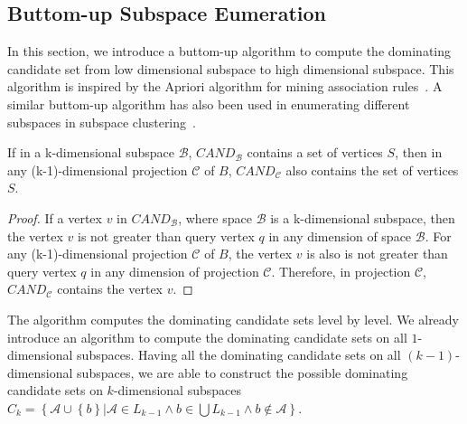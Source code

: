 \subsection{Buttom-up Subspace Eumeration}

In this section, we introduce a buttom-up algorithm to compute the dominating candidate set from low dimensional subspace to high dimensional subspace.
This algorithm is inspired by the Apriori algorithm for mining association rules~\cite{agrawal1996fast}. A similar buttom-up algorithm has also been used in enumerating different subspaces in subspace clustering~\cite{agrawal1998automatic}.

\begin{property}
If in a k-dimensional subspace $\mathcal{B}$, $\mathit{CAND}_\mathcal{B}$ contains a set of vertices $S$, then in any (k-1)-dimensional projection $\mathcal{C}$ of $B$, $\mathit{CAND}_\mathcal{C}$ also contains the set of vertices $S$.
\end{property}

\begin{proof}
If a vertex $v$ in $\mathit{CAND}_\mathcal{B}$, where space $\mathcal{B}$ is a k-dimensional subspace, then the vertex $v$ is not greater than query vertex $q$ in any dimension of space $\mathcal{B}$. For any (k-1)-dimensional projection $\mathcal{C}$ of $B$, the vertex $v$ is also is not greater than query vertex $q$ in any dimension of projection $\mathcal{C}$. Therefore, in projection $\mathcal{C}$, $\mathit{CAND}_\mathcal{C}$ contains the vertex $v$.
\end{proof}

The algorithm computes the dominating candidate sets level by level. We already introduce an algorithm to compute the dominating candidate sets on all $1$-dimensional subspaces. Having all the dominating candidate sets on all $(k-1)$-dimensional subspaces, we are able to construct the possible dominating candidate sets on $k$-dimensional subspaces $C_k = \left\{\mathcal{A} \cup \left\{b\right\} | \mathcal{A} \in L_{k-1} \wedge b \in \bigcup L_{k-1} \wedge b \notin \mathcal{A} \right\}$.

